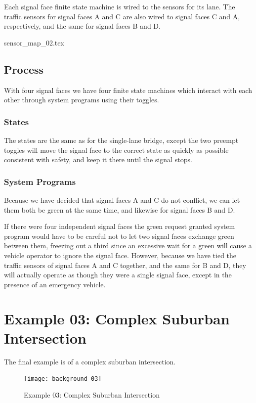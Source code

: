 \documentclass[letterpaper,twoside]{article}
\begin{document}
Each signal face finite state machine is wired to the sensors
for its lane.  The traffic sensors for signal faces A and C
are also wired to signal faces C and A, respectively, and
the same for signal faces B and D.

 {sensor_map_02.tex}

\subsection{Process}

With four signal faces we have four finite state machines which
interact with each other through system programs using their
toggles.

\subsubsection{States}

The states are the same as for the single-lane bridge,
except the two preempt toggles will move the signal face
to the correct state as quickly as possible consistent with
safety, and keep it there until the signal stops.

\subsubsection{System Programs}

Because we have decided that signal faces A and C do not conflict,
we can let them both be green at the same time, and likewise for
signal faces B and D.

If there were four independent signal faces the green request granted
system program would have to  be careful not to let two signal faces
exchange green between them, freezing out a third since an excessive
wait for a green will cause a vehicle operator to ignore the signal face.
However, because we have tied the traffic sensors of signal faces A and C
together, and the same for B and D, they will actually operate
as though they were a single signal face, except in the presence
of an emergency vehicle.

\section{Example 03: Complex Suburban Intersection}

The final example is of a complex suburban intersection.
\begin{figure}[htb]
  {\texttt{[image: background\_03]}}
  {\caption{Example 03: Complex Suburban Intersection}
    \label{fig:complex_intersection}}
\end{figure}
\end{document}
